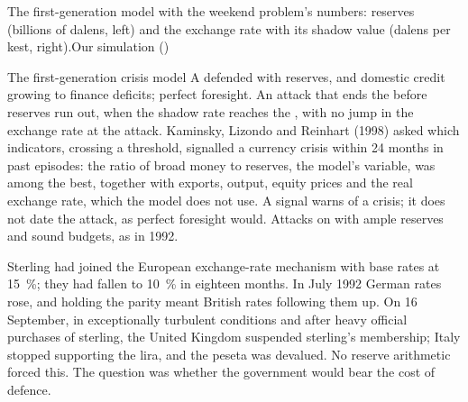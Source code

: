 \begin{omchart}{The first-generation model with the weekend problem's numbers:
reserves (billions of dalens, left) and the exchange rate with its shadow value
(dalens per kest, right).}{Our simulation ()}
\end{omchart}

\begin{model}{The first-generation crisis model}
\assumes A  defended with reserves, and domestic credit growing to finance
deficits; perfect foresight.
\predicts An attack that ends the  before reserves run out, when the shadow rate
reaches the , with no jump in the exchange rate at the attack.
\tested Kaminsky, Lizondo and Reinhart (1998) asked which indicators, crossing a
threshold, signalled a currency crisis within 24 months in past episodes: the ratio
of broad money to reserves, the model's variable, was among the best, together
with exports, output, equity prices and the real exchange rate, which the model
does not use. %
A signal warns of a crisis; it does not date the attack, as perfect foresight would.
\breaks Attacks on  with ample reserves and sound budgets, as in 1992.
\end{model}

\begin{record}
Sterling had joined the European exchange-rate mechanism with base rates at 15~\%;
they had fallen to 10~\% in eighteen months. In July 1992 German rates rose, and
holding the parity meant British rates following them up. On 16 September, in
exceptionally turbulent conditions and after heavy official purchases of sterling,
the United Kingdom suspended sterling's membership; Italy stopped supporting the
lira, and the peseta was devalued. %
No reserve arithmetic forced this. The question was whether the government
would bear the cost of defence.
\end{record}

